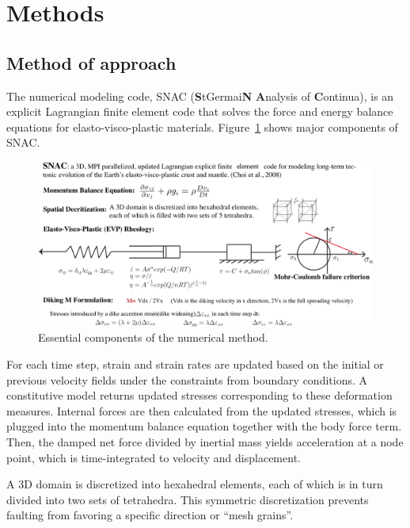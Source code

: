 \pagebreak
\section{Methods}
\label{ch:Methods}

\subsection{Method of approach}
The numerical modeling code, SNAC (\textbf{S}tGermai\textbf{N} \textbf{A}nalysis of \textbf{C}ontinua), is an explicit Lagrangian finite element code that solves the force and energy %
balance equations for elasto-visco-plastic materials. Figure~\ref{fig_Methods7_3} shows major components of SNAC.

\begin{figure}[h]
 \centering
  \includegraphics[width=1.0\textwidth]{./Figures/fig_Methods7_3.png}
 \caption{\small{Essential components of the numerical method.}}
 \label{fig_Methods7_3}
\end{figure}

For each time step, strain and strain rates are updated based on the initial or previous velocity fields under the constraints from boundary conditions. A constitutive model returns updated stresses corresponding to these deformation measures. Internal forces are then calculated from the updated stresses, which is plugged into the momentum balance equation together with the body force term. Then, the damped
net force divided by inertial mass yields acceleration at a node point, which is time-integrated to velocity and displacement.

A 3D domain is discretized into hexahedral elements, each of which is in turn divided into two sets of tetrahedra. This symmetric discretization prevents faulting from favoring a specific direction or ``mesh grains''. 

